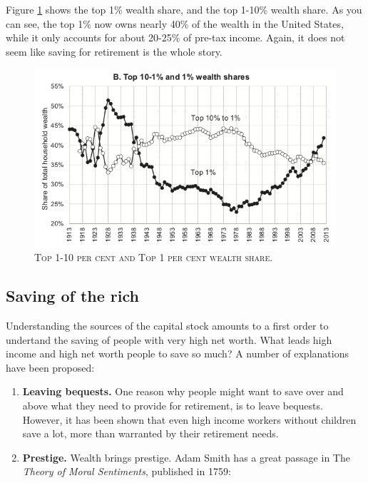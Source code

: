 \documentclass[]{book}
\theoremstyle{definition}
\theoremstyle{definition}
\theoremstyle{definition}
\theoremstyle{remark}
\begin{document}
Figure \ref{fig:saez-zucman-fig6b} shows the top 1\% wealth share, and
the top 1-10\% wealth share. As you can see, the top 1\% now owns nearly
40\% of the wealth in the United States, while it only accounts for
about 20-25\% of pre-tax income. Again, it does not seem like saving for
retirement is the whole story.




\begin{figure}

{\centering \includegraphics[width=1\linewidth]{figures/fig6b} 

}

\caption{\textsc{Top 1-10 per cent and Top 1 per cent
wealth share}.}\label{fig:saez-zucman-fig6b}
\end{figure}

\subsection{Saving of the rich}\label{saving-of-the-rich}

Understanding the sources of the capital stock amounts to a first order
to undertand the saving of people with very high net worth. What leads
high income and high net worth people to save so much? A number of
explanations have been proposed:

\begin{enumerate}
\def\labelenumi{\arabic{enumi}.}
\item
  \textbf{Leaving bequests.} One reason why people might want to save
  over and above what they need to provide for retirement, is to leave
  bequests. However, it has been shown that even high income workers
  without children save a lot, more than warranted by their retirement
  needs.
\item
  \textbf{Prestige.} Wealth brings prestige. Adam Smith has a great
  passage in The \emph{Theory of Moral Sentiments}, published in 1759:
\end{enumerate}
\end{document}
